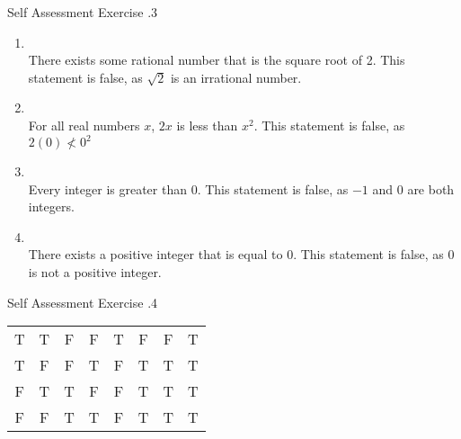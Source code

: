 \documentclass[../notes.tex]{subfiles}
\begin{document}
				\begin{exercise}{Self Assessment Exercise \thechapter.3}
					\begin{enumerate}[label=(\alph*)]
						\item {}\\
							There exists some rational number that is the square root of 2. This statement is false, as $\sqrt{2}$ is an irrational number.
						\item {}\\
							For all real numbers $x$, $2x$ is less than $x^{2}$. This statement is false, as $2(0) \not < 0^{2}$
						\item {}\\
							Every integer is greater than $0$. This statement is false, as $-1$ and $0$ are both integers.
						\item {}\\
							There exists a positive integer that is equal to $0$. This statement is false, as $0$ is not a positive integer.
					\end{enumerate}
				\end{exercise}
				\pagebreak
				\begin{exercise}{Self Assessment Exercise \thechapter.4}
					\begin{center}
						\begin{tabular}{| c c | c c | c | c | c | c|}
							\hline
							\tablehead{$p$} & \tablehead{$q$} & \tablehead{$\lnot p$} & \tablehead{$\lnot q$} & \tablehead{$p \land q$} & \tablehead{$\lnot (p \land q)$} & \tablehead{$(\lnot p) \lor (\lnot q)$} & \tablehead{$\lnot (p \land q) \leftrightarrow (\lnot p) \lor (\lnot q)$}\\
							\hline
							T & T & F & F & T & F & F & T\\
							T & F & F & T & F & T & T & T\\
							F & T & T & F & F & T & T & T\\
							F & F & T & T & F & T & T & T\\
							\hline
						\end{tabular}
					\end{center}
				\end{exercise}
\end{document}
